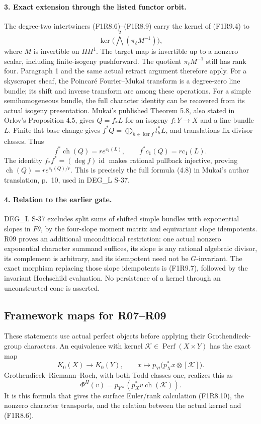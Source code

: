 \paragraph{3. Exact extension through the listed functor orbit.}
The degree-two intertwiners (F1R8.6)--(F1R8.9) carry the kernel of
(F1R9.4) to
\[
           \ker\bigl(\bigwedge^2(\pi_\ell M^{-1})\bigr),
 \tag{F1R9.8}
\]
where $M$ is invertible on $HH^1$. The target map is invertible
up to a nonzero scalar, including finite-isogeny pushforward.
The quotient $\pi_\ell M^{-1}$ still has rank four. Paragraph 1
and the same actual retract argument therefore apply. For a
skyscraper sheaf, the Poincar\'e Fourier--Mukai transform is a
degree-zero line bundle; its shift and inverse transform are among
these operations. For a simple semihomogeneous bundle, the full
character identity can be recovered from its actual isogeny
presentation. Mukai's published Theorem 5.8, also stated in
Orlov's Proposition 4.5, gives $Q=f_*L$ for an isogeny
$f:Y\to X$ and a line bundle $L$. Finite flat base change gives
$f^*Q=\bigoplus_{h\in\ker f}t_h^*L$, and translations fix divisor
classes. Thus
\[
 f^*\operatorname{ch}(Q)=r e^{c_1(L)},\qquad
 f^*c_1(Q)=r c_1(L).
\]
The identity $f_*f^*=(\deg f)\operatorname{id}$ makes rational
pullback injective, proving
$\operatorname{ch}(Q)=r e^{c_1(Q)/r}$. This is precisely the
full formula (4.8) in Mukai's author translation, p.~10, used
in DEG\_L S-37.

\paragraph{4. Relation to the earlier gate.}
DEG\_L S-37 excludes split sums of shifted simple bundles with
exponential slopes in $F\theta$, by the four-slope moment matrix
and equivariant slope idempotents. R09 proves an additional
unconditional restriction: one actual nonzero exponential
character summand suffices, its slope is any rational algebraic
divisor, its complement is arbitrary, and its idempotent need not
be $G$-invariant. The exact morphism replacing those slope
idempotents is (F1R9.7), followed by the invariant Hochschild
evaluation. No persistence of a kernel through an unconstructed
cone is asserted.

\subsection*{Framework maps for R07--R09}

These statements use actual perfect objects before applying their
Grothendieck-group characters. An equivalence with kernel
$\mathcal K\in\operatorname{Perf}(X\times Y)$ has the exact map
\[
 K_0(X)\longrightarrow K_0(Y),\qquad
 x\longmapsto p_{Y!}\bigl(p_X^*x\otimes[\mathcal K]\bigr).
 \tag{F1R9.9}
\]
Grothendieck--Riemann--Roch, with both Todd classes one, realizes
this as
\[
             \Phi^H(v)=p_{Y*}(p_X^*v\operatorname{ch}(\mathcal K)).
\]
It is this formula that gives the surface Euler/rank calculation
(F1R8.10), the nonzero character transports, and the relation
between the actual kernel and (F1R8.6).


